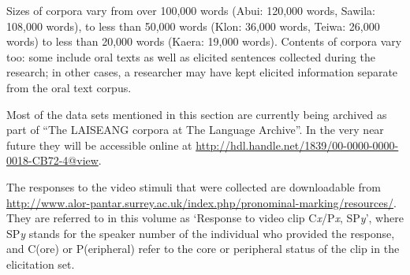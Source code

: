 Sizes of corpora vary from over 100,000 words (Abui: 120,000 words, Sawila: 108,000 words), to less than 50,000 words (Klon: 36,000 words, Teiwa: 26,000 words) to less than 20,000 words (Kaera: 19,000 words). Contents of corpora vary too: some include oral texts as well as elicited sentences collected during the research; in other cases, a researcher may have kept elicited information separate from the oral text corpus.

Most of the data sets mentioned in this section are currently being archived as part of ``The LAISEANG corpora at The Language Archive''. In the very near future they will be accessible online at \href{https://webmail.campus.leidenuniv.nl/owa/redir.aspx?C=VcF3tDaLq0iIlRczzT0ZXw_xD4uU3tAIZUYVDzSuO7QzFpu5wi759CTWognlXJNmDHNv_KzsnWc. & URL=http://hdl.handle.net/1839/00-0000-0000-0018-CB72-4@view}{http://hdl.handle.net/1839/00-0000-0000-0018-CB72-4@view}.

The responses to the video stimuli that were collected are downloadable from \url{http://www.alor-pantar.surrey.ac.uk/index.php/pronominal-marking/resources/}. They are referred to in this volume as `Response to video clip C\textit{x}/P\textit{x}, SP\textit{y}', where SP\textit{y} stands for the speaker number of the individual who provided the response, and C(ore) or P(eripheral) refer to the core or peripheral status of the clip in the elicitation set.

